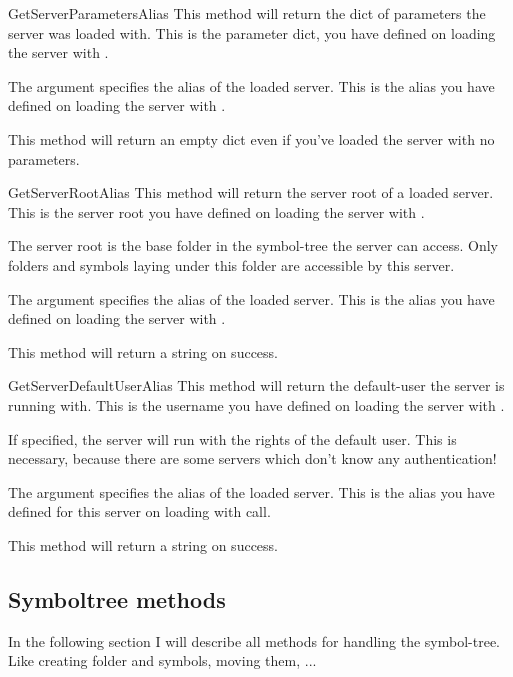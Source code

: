 \begin{methoddesc}[System]{GetServerParameters}{Alias}
This method will return the dict of parameters the server was loaded with. 
This is the parameter dict, you have defined on loading the server with 
.

The argument  specifies the alias of the loaded server. This is
the alias you have defined on loading the server with .

This method will return an empty dict even if you've loaded the server with no
parameters.
\end{methoddesc}


\begin{methoddesc}[System]{GetServerRoot}{Alias}
This method will return the server root of a loaded server. This is the 
server root you have defined on loading the server with .

The server root is the base folder in the symbol-tree the server can access. 
Only folders and symbols laying under this folder are accessible by this 
server.

The argument  specifies the alias of the loaded server. This is the
alias you have defined on loading the server with . 

This method will return a string on success.
\end{methoddesc}


\begin{methoddesc}[System]{GetServerDefaultUser}{Alias}
This method will return the default-user the server is running with. This is
the username you have defined on loading the server with .

If specified, the server will run with the rights of the default user. This is
necessary, because there are some servers which don't know any authentication!

The argument  specifies the alias of the loaded server. This is the 
alias you have defined for this server on loading with  
call.

This method will return a string on success.
\end{methoddesc}


\subsection{Symboltree methods}
In the following section I will describe all methods for handling the symbol-tree. 
Like creating folder and symbols, moving them, ...

